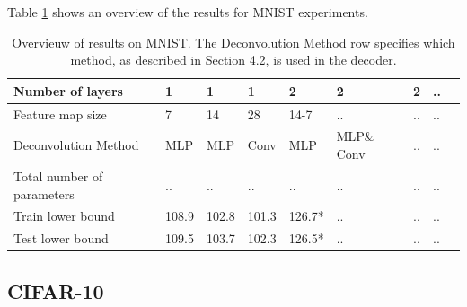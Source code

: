 Table \ref{overview} shows an overview of the results for MNIST experiments. 
\begin{table}
\caption{Overvieuw of results on MNIST. The Deconvolution Method row specifies which method, as described in Section 4.2, is used in the decoder.}
\renewcommand{\arraystretch}{1.5}
\label{overview}
\begin{tabular}{| l | l | l | l | l | l | l | l | l |}

	\hline
  Number of layers 					& 1 	 	& 1 		& 1 		& 2 		& 2 			& 2 		& .. \\ \hline
  Feature map size 					& 7 		& 14 	& 28 	& 14-7	& ..			& .. 	& .. \\ \hline
  Deconvolution Method 				& MLP 	& MLP	& Conv 	& MLP	& MLP\& Conv	& ..		& ..	 \\ \hline
  Total number of parameters 		& .. 	& .. 	& ..		& ..		& ..			& .. 	& .. \\ \hline
  Train lower bound 					& 108.9 	& 102.8 	& 101.3 	& 126.7*	& ..			& ..		& .. \\ \hline
  Test lower bound 					& 109.5	& 103.7 	& 102.3 	& 126.5*	& ..			& ..		& .. \\ \hline
\end{tabular}
\end{table}


\subsection{CIFAR-10}







